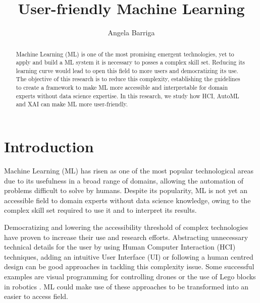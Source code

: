 \documentclass[runningheads]{llncs}
\begin{document}
	\title{User-friendly Machine Learning}
	\author{Angela Barriga}
	\maketitle              %
	\begin{abstract}
	Machine Learning (ML) is one of the most promising emergent technologies, yet to apply
	and build a ML system it is necessary to posses a complex skill set. Reducing its
	learning curve would lead to open this field to more users and democratizing its use. 
	The objective of this research is to reduce this complexity, establishing the guidelines to 
	create a framework to make ML more accessible and interpretable for domain experts without data science expertise. In this research, we study how HCI, AutoML and XAI can make ML more user-friendly.
		
	\end{abstract}
	\section{Introduction}\label{intro}
		
	Machine Learning (ML) has risen as one of the most popular technological areas due to its usefulness in
	a broad range of domains, allowing the automation of problems difficult to solve by humans. Despite its
	popularity, ML is not yet an accessible field to domain experts without data science knowledge, owing
	to the complex skill set required to use it and to interpret its results.  
	
	Democratizing and lowering the accessibility threshold of complex technologies have proven to increase
	their use and research efforts. Abstracting unnecessary technical details for the user by using Human
	Computer Interaction (HCI) techniques, adding an intuitive User Interface (UI) or following a human
	centred design can be good approaches in tackling this complexity issue. Some successful
	examples are visual programming for controlling drones \cite{dronely} or the use of Lego blocks in
	robotics \cite{lego}. ML could make use of these approaches to be transformed into an easier to
	access field. 
	
\end{document}
